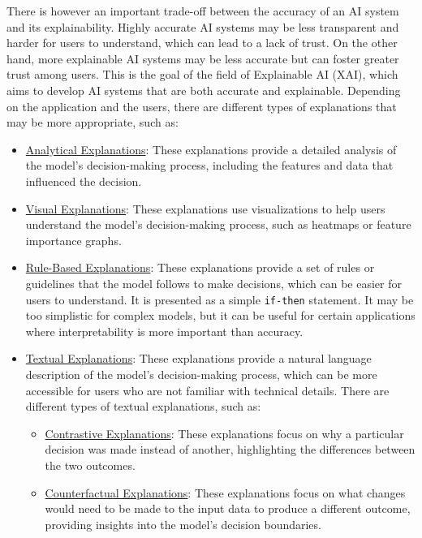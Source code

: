There is however an important trade-off between the accuracy of an AI system and its explainability. Highly accurate AI systems may be less transparent and harder for users to understand, which can lead to a lack of trust. On the other hand, more explainable AI systems may be less accurate but can foster greater trust among users. This is the goal of the field of Explainable AI (XAI), which aims to develop AI systems that are both accurate and explainable. Depending on the application and the users, there are different types of explanations that may be more appropriate, such as:
\begin{itemize}
    \item \ul{Analytical Explanations}: These explanations provide a detailed analysis of the model's decision-making process, including the features and data that influenced the decision.
    \item \ul{Visual Explanations}: These explanations use visualizations to help users understand the model's decision-making process, such as heatmaps or feature importance graphs.
    \item \ul{Rule-Based Explanations}: These explanations provide a set of rules or guidelines that the model follows to make decisions, which can be easier for users to understand. It is presented as a simple \texttt{if-then} statement. It may be too simplistic for complex models, but it can be useful for certain applications where interpretability is more important than accuracy.
    \item \ul{Textual Explanations}: These explanations provide a natural language description of the model's decision-making process, which can be more accessible for users who are not familiar with technical details. There are different types of textual explanations, such as:
    \begin{itemize}
        \item \ul{Contrastive Explanations}: These explanations focus on why a particular decision was made instead of another, highlighting the differences between the two outcomes.
        \item \ul{Counterfactual Explanations}: These explanations focus on what changes would need to be made to the input data to produce a different outcome, providing insights into the model's decision boundaries.
    \end{itemize}
\end{itemize}


